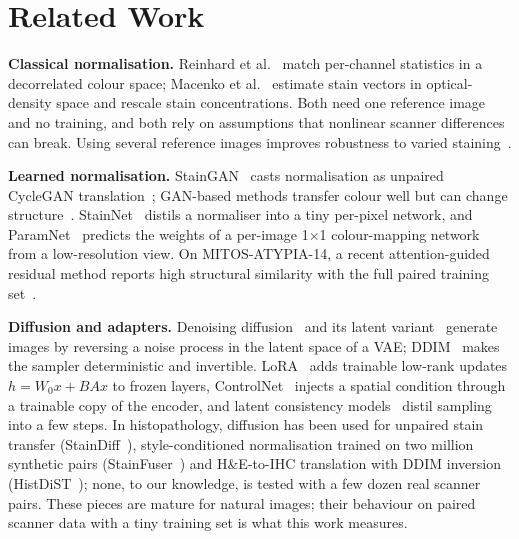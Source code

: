 \section{Related Work}
\label{sec:related}

\textbf{Classical normalisation.} Reinhard et al.~\cite{reinhard2001colortransfer} match per-channel
statistics in a decorrelated colour space; Macenko et al.~\cite{macenko2009normalisation} estimate stain
vectors in optical-density space and rescale stain concentrations. Both need one reference image and no
training, and both rely on assumptions that nonlinear scanner differences can break. Using several
reference images improves robustness to varied staining~\cite{ivanov2024multitarget}.

\textbf{Learned normalisation.} StainGAN~\cite{shaban2019staingan} casts normalisation as unpaired
CycleGAN translation~\cite{zhu2017cyclegan}; GAN-based methods transfer colour well but can change
structure~\cite{breen2024gans}. StainNet~\cite{kang2021stainnet} distils a normaliser into a tiny
per-pixel network, and ParamNet~\cite{kang2024paramnet} predicts the weights of a per-image 1$\times$1
colour-mapping network from a low-resolution view. On MITOS-ATYPIA-14, a recent attention-guided residual
method reports high structural similarity with the full paired training set~\cite{madusanka2025attentionresidual}.

\textbf{Diffusion and adapters.} Denoising diffusion~\cite{ho2020ddpm} and its latent variant~\cite{rombach2022ldm}
generate images by reversing a noise process in the latent space of a VAE; DDIM~\cite{song2021ddim} makes
the sampler deterministic and invertible. LoRA~\cite{hu2021lora} adds trainable low-rank updates
$h=W_0x+BAx$ to frozen layers, ControlNet~\cite{zhang2023controlnet} injects a spatial condition through a
trainable copy of the encoder, and latent consistency models~\cite{luo2023lcm,luo2023lcmlora} distil
sampling into a few steps. In histopathology, diffusion has been used for unpaired stain transfer (StainDiff~\cite{shen2023staindiff}), style-conditioned normalisation trained on two million synthetic pairs (StainFuser~\cite{jewsbury2024stainfuser}) and H\&E-to-IHC translation with DDIM inversion (HistDiST~\cite{grosskopf2025histdist}); none, to our knowledge, is tested with a few dozen real scanner pairs. These pieces are mature for natural images; their behaviour on paired scanner
data with a tiny training set is what this work measures.

